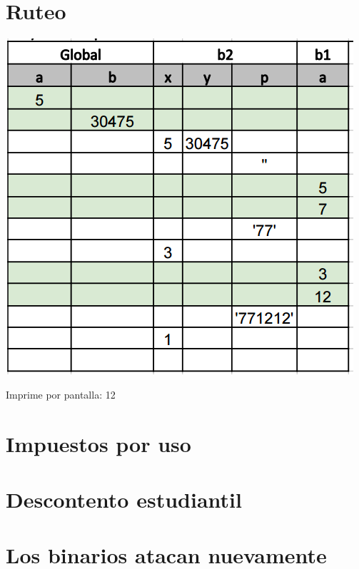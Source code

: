 \section{Ruteo}

  \includegraphics{Imagenes/2015-1-c1.PNG}
  
  Imprime por pantalla: 12
    
\section{Impuestos por uso}

    
\pagebreak[4]
\section{Descontento estudiantil}

    
    
\section{Los binarios atacan nuevamente}

    
